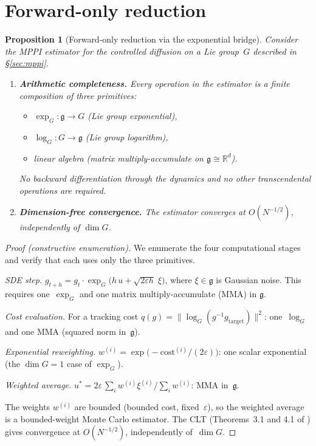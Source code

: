 \documentclass[12pt]{amsart}
\newtheorem{proposition}[theorem]{Proposition}
\theoremstyle{definition}
\theoremstyle{remark}
\newcommand{\R}{\mathbb{R}}
\begin{document}
\section{Forward-only reduction}\label{sec:forward-only}

\begin{proposition}[Forward-only reduction via the exponential bridge]
\label{prop:forward-only}
Consider the MPPI estimator for the controlled diffusion on a Lie group~$G$
described in \S\ref{sec:mppi}.
\begin{enumerate}[label=\textup{(\roman*)}]
\item \textbf{Arithmetic completeness.}
Every operation in the estimator is a finite composition of three primitives:
\begin{itemize}[nosep]
\item $\exp_G : \mathfrak{g} \to G$ \textup{(}Lie group exponential\textup{)},
\item $\log_G : G \to \mathfrak{g}$ \textup{(}Lie group logarithm\textup{)},
\item linear algebra \textup{(}matrix multiply-accumulate on
      $\mathfrak{g} \cong \R^d$\textup{)}.
\end{itemize}
No backward differentiation through the dynamics and no other transcendental
operations are required.
\item \textbf{Dimension-free convergence.}
The estimator converges at $O(N^{-1/2})$, independently of $\dim G$.
\end{enumerate}
\end{proposition}

\begin{proof}[Proof \textup{(}constructive enumeration\textup{)}]
We enumerate the four computational stages and verify that each uses only the
three primitives.

\medskip\noindent\emph{SDE step.}
$g_{t+h} = g_t \cdot \exp_G\!\bigl(h\,u + \sqrt{2\varepsilon h}\;\xi\bigr)$,
where $\xi \in \mathfrak{g}$ is Gaussian noise.
This requires one~$\exp_G$ and one matrix multiply-accumulate (MMA) in
$\mathfrak{g}$.

\medskip\noindent\emph{Cost evaluation.}
For a tracking cost $q(g) = \bigl\|\log_G(g^{-1}g_{\mathrm{target}})\bigr\|^2$:
one~$\log_G$ and one MMA (squared norm in~$\mathfrak{g}$).

\medskip\noindent\emph{Exponential reweighting.}
$w^{(i)} = \exp\!\bigl(-\mathrm{cost}^{(i)}/(2\varepsilon)\bigr)$:
one scalar exponential (the $\dim G = 1$ case of $\exp_G$).

\medskip\noindent\emph{Weighted average.}
$u^* = 2\varepsilon\,\sum_i w^{(i)}\xi^{(i)}\big/\sum_i w^{(i)}$:
MMA in~$\mathfrak{g}$.

\medskip\noindent
The weights $w^{(i)}$ are bounded (bounded cost, fixed~$\varepsilon$), so the
weighted average is a bounded-weight Monte Carlo estimator. The CLT
(Theorems~3.1 and 4.1 of \cite{OCT}) gives convergence at $O(N^{-1/2})$,
independently of~$\dim G$.
\end{proof}
\end{document}
